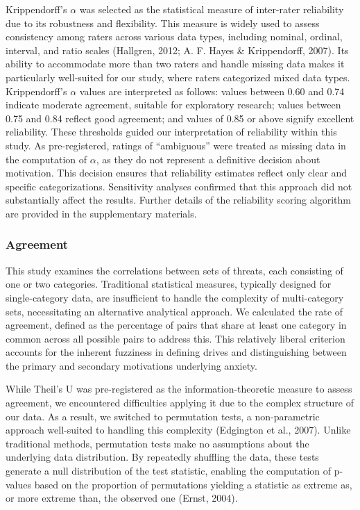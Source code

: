 \documentclass[
  man,floatsintext]{apa7}
\begin{document}
Krippendorff's \(\alpha\) was selected as the statistical measure of inter-rater reliability due to its robustness and flexibility.
This measure is widely used to assess consistency among raters across various data types, including nominal, ordinal, interval, and ratio scales (Hallgren, 2012; A. F. Hayes \& Krippendorff, 2007).
Its ability to accommodate more than two raters and handle missing data makes it particularly well-suited for our study, where raters categorized mixed data types.
Krippendorff's \(\alpha\) values are interpreted as follows: values between 0.60 and 0.74 indicate moderate agreement, suitable for exploratory research; values between 0.75 and 0.84 reflect good agreement; and values of 0.85 or above signify excellent reliability.
These thresholds guided our interpretation of reliability within this study.
As pre-registered, ratings of ``ambiguous'' were treated as missing data in the computation of \(\alpha\), as they do not represent a definitive decision about motivation.
This decision ensures that reliability estimates reflect only clear and specific categorizations.
Sensitivity analyses confirmed that this approach did not substantially affect the results.
Further details of the reliability scoring algorithm are provided in the supplementary materials.

\subsubsection{Agreement}\label{agreement}

This study examines the correlations between sets of threats, each consisting of one or two categories.
Traditional statistical measures, typically designed for single-category data, are insufficient to handle the complexity of multi-category sets, necessitating an alternative analytical approach.
We calculated the rate of agreement, defined as the percentage of pairs that share at least one category in common across all possible pairs to address this.
This relatively liberal criterion accounts for the inherent fuzziness in defining drives and distinguishing between the primary and secondary motivations underlying anxiety.

While Theil's U was pre-registered as the information-theoretic measure to assess agreement, we encountered difficulties applying it due to the complex structure of our data.
As a result, we switched to permutation tests, a non-parametric approach well-suited to handling this complexity (Edgington et al., 2007).
Unlike traditional methods, permutation tests make no assumptions about the underlying data distribution.
By repeatedly shuffling the data, these tests generate a null distribution of the test statistic, enabling the computation of p-values based on the proportion of permutations yielding a statistic as extreme as, or more extreme than, the observed one (Ernst, 2004).
\end{document}
